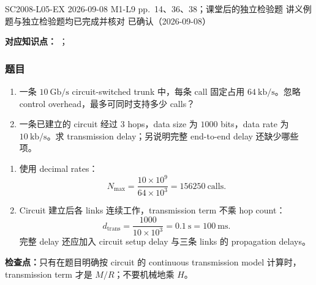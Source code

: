 

\examplemeta
  {SC2008-L05-EX}
  {2026-09-08}
  {M1-L9 pp.~14、36、38；课堂后的独立检验题}
  {讲义例题与独立检验题均已完成并核对}
  {已确认（2026-09-08）}


\textbf{对应知识点：}
；\\

\subsubsection*{题目}

\begin{enumerate}[label=(\alph*)]
  \item 一条 $10\ \mathrm{Gb/s}$ circuit-switched trunk 中，每条 call 固定占用 $64\ \mathrm{kb/s}$。忽略 control overhead，最多可同时支持多少 calls？
  \item 一条已建立的 circuit 经过 3 hops，data size 为 $1000$ bits，data rate 为 $10\ \mathrm{kb/s}$。求 transmission delay；另说明完整 end-to-end delay 还缺少哪些项。
\end{enumerate}

\begin{checkedsolution}
\begin{enumerate}[label=(\alph*)]
  \item 使用 decimal rates：
  \[
    N_{\max}=\frac{10\times10^9}{64\times10^3}
    =\boxed{156250\ \text{calls}}.
  \]
  \item Circuit 建立后各 links 连续工作，transmission term 不乘 hop count：
  \[
    d_{\mathrm{trans}}=\frac{1000}{10\times10^3}
    =\boxed{0.1\ \mathrm{s}=100\ \mathrm{ms}}.
  \]
  完整 delay 还应加入 circuit setup delay 与三条 links 的 propagation delays。
\end{enumerate}
\end{checkedsolution}

\textbf{检查点：}只有在题目明确按 circuit 的 continuous transmission model 计算时，transmission term 才是 $M/R$；不要机械地乘 $H$。


